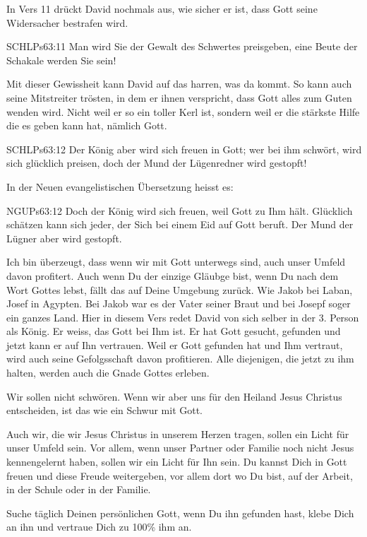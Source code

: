 \documentclass[14pt]{../../inc/mybib}
\begin{document}
\begin{block}
    In Vers 11 drückt David nochmals aus, wie sicher er ist, dass Gott seine Widersacher bestrafen wird.
    \begin{bibelbox}{SCHL}{Ps}{63:11}
        Man wird Sie der Gewalt des Schwertes preisgeben, eine Beute der Schakale werden Sie sein!
    \end{bibelbox}
    Mit dieser Gewissheit kann David auf das harren, was da kommt. So kann auch seine Mitstreiter trösten, in dem er ihnen verspricht, dass Gott alles zum Guten wenden wird. 
    Nicht weil er so ein toller Kerl ist, sondern weil er die stärkste Hilfe die es geben kann hat, nämlich Gott. 
\end{block}
\begin{block}
    \begin{bibelbox}{SCHL}{Ps}{63:12}
        Der König aber wird sich freuen in Gott; wer bei ihm schwört, wird sich glücklich preisen, doch der Mund der Lügenredner wird gestopft!
    \end{bibelbox}
    In der Neuen evangelistischen Übersetzung heisst es:
    \begin{bibelbox}{NGU}{Ps}{63:12}
        Doch der König wird sich freuen, weil Gott zu Ihm hält. Glücklich schätzen kann sich jeder, der Sich bei einem Eid auf Gott beruft. Der Mund der Lügner aber wird gestopft.
    \end{bibelbox}
    \begin{block}
        Ich bin überzeugt, dass wenn wir mit Gott unterwegs sind, auch unser Umfeld davon profitert. Auch wenn Du der einzige Gläubge bist, wenn Du nach dem Wort Gottes lebst, fällt das auf Deine Umgebung zurück. Wie Jakob bei Laban, Josef in Agypten. Bei Jakob war es der Vater seiner Braut und bei Josepf soger ein ganzes Land.
        Hier in diesem Vers redet David von sich selber in der 3. Person als König. Er weiss, das Gott bei Ihm ist. Er hat Gott gesucht, gefunden und jetzt kann er auf Ihn vertrauen. Weil er Gott gefunden hat und Ihm vertraut, wird auch seine Gefolgsschaft davon profitieren. Alle diejenigen, die jetzt zu ihm halten, werden auch die Gnade Gottes erleben.

        Wir sollen nicht schwören. Wenn wir aber uns für den Heiland Jesus Christus entscheiden, ist das wie ein Schwur mit Gott.
    \end{block}
    \begin{block}
        Auch wir, die wir Jesus Christus in unserem Herzen tragen, sollen ein Licht für unser Umfeld sein. Vor allem, wenn unser Partner oder Familie noch nicht Jesus kennengelernt haben, sollen wir ein Licht für Ihn sein.        
        Du kannst Dich in Gott freuen und diese Freude weitergeben, vor allem dort wo Du bist, auf der Arbeit, in der Schule oder in der Familie.
\end{block}
    Suche täglich Deinen persönlichen Gott, wenn Du ihn gefunden hast, klebe Dich an ihn und vertraue Dich zu 100\% ihm an.
    \beten
\end{block}  
\end{document}
